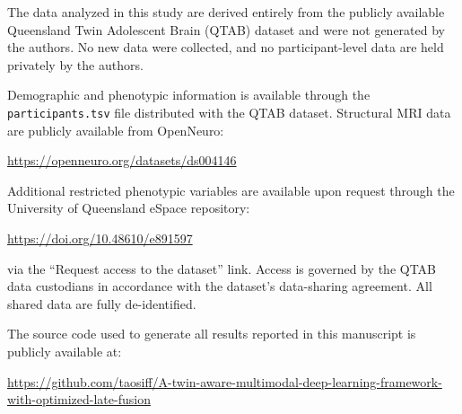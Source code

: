 \documentclass[10pt,letterpaper]{article}
\begin{document}
The data analyzed in this study are derived entirely from the publicly available Queensland Twin Adolescent Brain (QTAB) dataset and were not generated by the authors. No new data were collected, and no participant-level data are held privately by the authors.

Demographic and phenotypic information is available through the \texttt{participants.tsv} file distributed with the QTAB dataset. Structural MRI data are publicly available from OpenNeuro:

\begin{center}
\url{https://openneuro.org/datasets/ds004146}
\end{center}

Additional restricted phenotypic variables are available upon request through the University of Queensland eSpace repository:

\begin{center}
\url{https://doi.org/10.48610/e891597}
\end{center}

via the ``Request access to the dataset'' link. Access is governed by the QTAB data custodians in accordance with the dataset's data-sharing agreement. All shared data are fully de-identified.

The source code used to generate all results reported in this manuscript is publicly available at:

\begin{center}
\url{https://github.com/taosiff/A-twin-aware-multimodal-deep-learning-framework-with-optimized-late-fusion}
\end{center}
\end{document}
